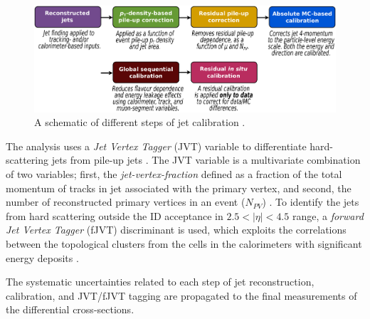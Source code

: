 \begin{figure}[!htbp]
    \centering
    \includegraphics[width=.95\linewidth]{figures/LHC/JetCalib.pdf}
    \caption{ A schematic of different steps of jet calibration \cite{JetCalib}.\label{fig:JetCalib}}
\end{figure}

The analysis uses a \textit{Jet Vertex Tagger} (JVT) variable to differentiate hard-scattering jets from pile-up jets \cite{JVT}. The JVT variable is a multivariate combination of two variables; first, the \textit{jet-vertex-fraction} defined as a fraction of the total momentum of tracks in jet associated with the primary vertex, and second, the number of reconstructed primary vertices in an event ($N_{PV}$) \cite{JVT}. To identify the jets from hard scattering outside the ID acceptance in $2.5<|\eta|<4.5$ range, a \textit{forward Jet Vertex Tagger} (fJVT) discriminant is used, which exploits the correlations between the topological clusters from the cells in the calorimeters with significant energy deposits \cite{fJVT}.

The systematic uncertainties related to each step of jet reconstruction, calibration, and JVT/fJVT tagging are propagated to the final measurements of the differential cross-sections. 
